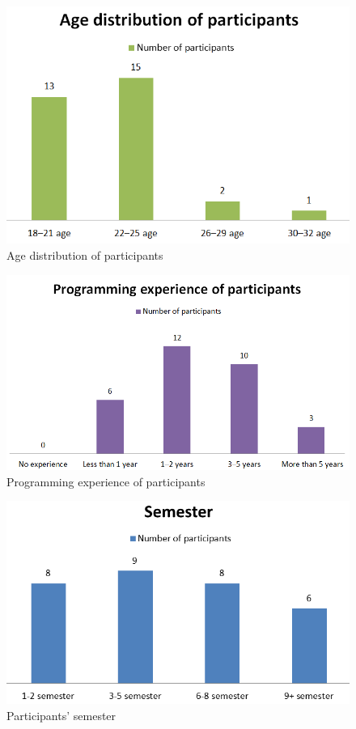 \begin{figure} [H]
  \centering
  \includegraphics[scale=0.9]{figures/age.png}
  \caption{Age distribution of participants}
  \label{fig:AnhangsChor}
\end{figure}

\begin{figure} [H]
  \centering
  \includegraphics[scale=1.1]{figures/p_exp.png}
  \caption{Programming experience of participants}
  \label{fig:AnhangsChor}
\end{figure}

\begin{figure} [H]
  \centering
  \includegraphics[scale=1.1]{figures/semester.png}
  \caption{Participants' semester}
  \label{fig:AnhangsChor}
\end{figure}


